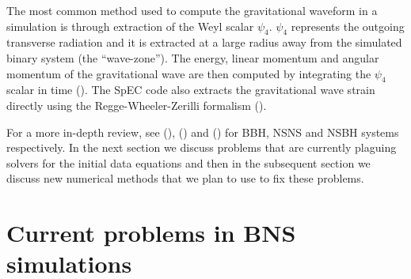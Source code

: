 The most common method used to compute the gravitational waveform in a simulation is through extraction of the Weyl scalar $\psi_{4}$. $\psi_{4}$ represents the outgoing transverse radiation and it is extracted at a large radius away from the simulated binary system (the ``wave-zone''). The energy, linear momentum and angular momentum of the gravitational wave are then computed by integrating the $\psi_{4}$ scalar in time (\citet*{kyutoku2015dynamical}). The SpEC code also extracts the gravitational wave strain directly using the Regge-Wheeler-Zerilli formalism (\citet*{Boyle:2019kee}).

For a more in-depth review, see (\citet*{sperhake2014numerical}), (\citet*{faber2012binary}) and (\citet*{shibata2011coalescence}) for BBH, NSNS and NSBH systems respectively. In the next section we discuss problems that are currently plaguing solvers for the initial data equations and then in the subsequent section we discuss new numerical methods that we plan to use to fix these problems.

\section{Current problems in BNS simulations}

